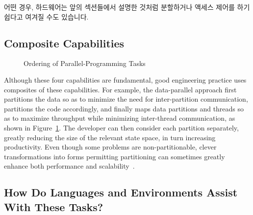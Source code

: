 어떤 경우, 하드웨어는 앞의 섹션들에서 설명한 것처럼 분할하거나 액세스 제어를
하기 쉽다고 여겨질 수도 있습니다.

\subsection{Composite Capabilities}
\label{sec:Composite Capabilities}

\begin{figure}[tb]
\centering
{}
\caption{Ordering of Parallel-Programming Tasks}
\label{fig:intro:Ordering of Parallel-Programming Tasks}
\end{figure}

Although these four capabilities are fundamental,
good engineering practice uses composites of
these capabilities.
For example, the data-parallel approach first
partitions the data so as to minimize the need for
inter-partition communication, partitions the code accordingly,
and finally maps data partitions and threads so as to maximize
throughput while minimizing inter-thread communication,
as shown in
Figure~\ref{fig:intro:Ordering of Parallel-Programming Tasks}.
The developer can then
consider each partition separately, greatly reducing the size
of the relevant state space, in turn increasing productivity.
Even though some problems are non-partitionable,
clever transformations into forms permitting partitioning can
sometimes greatly enhance
both performance and scalability~\cite{PanagiotisMetaxas1999PDCS}.

\subsection{How Do Languages and Environments Assist With These Tasks?}
\label{sec:intro:How Do Languages and Environments Assist With These Tasks?}

